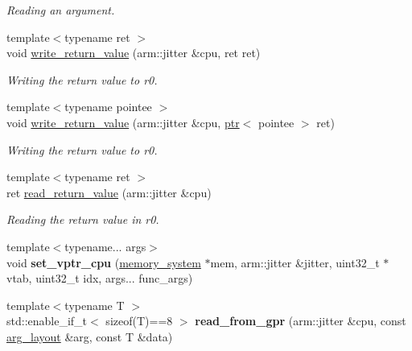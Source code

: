 \begin{DoxyCompactItemize}
\begin{DoxyCompactList}\small\item\em Reading an argument. \end{DoxyCompactList}\item 
{\footnotesize template$<$typename ret $>$ }\\void \mbox{\hyperlink{namespaceeka2l1_1_1hle_ae6e670dc04b65bf275586cd1e5183d2b}{write\+\_\+return\+\_\+value}} (arm\+::jitter \&cpu, ret ret)
\begin{DoxyCompactList}\small\item\em Writing the return value to r0. \end{DoxyCompactList}\item 
{\footnotesize template$<$typename pointee $>$ }\\void \mbox{\hyperlink{namespaceeka2l1_1_1hle_a4459527ec360342d62e8cb01de2634f4}{write\+\_\+return\+\_\+value}} (arm\+::jitter \&cpu, \mbox{\hyperlink{classeka2l1_1_1ptr}{ptr}}$<$ pointee $>$ ret)
\begin{DoxyCompactList}\small\item\em Writing the return value to r0. \end{DoxyCompactList}\item 
{\footnotesize template$<$typename ret $>$ }\\ret \mbox{\hyperlink{namespaceeka2l1_1_1hle_a8ef613fd50bfcf8c9f12277fab20005b}{read\+\_\+return\+\_\+value}} (arm\+::jitter \&cpu)
\begin{DoxyCompactList}\small\item\em Reading the return value in r0. \end{DoxyCompactList}\item 
\mbox{\label{namespaceeka2l1_1_1hle_ac65c3d07be4c03479e5daf5a67f6a43f}} 
{\footnotesize template$<$typename... args$>$ }\\void {\bfseries set\+\_\+vptr\+\_\+cpu} (\mbox{\hyperlink{classeka2l1_1_1memory__system}{memory\+\_\+system}} $\ast$mem, arm\+::jitter \&jitter, uint32\+\_\+t $\ast$vtab, uint32\+\_\+t idx, args... func\+\_\+args)
\item 
\mbox{\label{namespaceeka2l1_1_1hle_a0b325c11bead99365d57fae586d47cf8}} 
{\footnotesize template$<$typename T $>$ }\\std\+::enable\+\_\+if\+\_\+t$<$ sizeof(T)==8 $>$ {\bfseries read\+\_\+from\+\_\+gpr} (arm\+::jitter \&cpu, const \mbox{\hyperlink{structeka2l1_1_1hle_1_1arg__layout}{arg\+\_\+layout}} \&arg, const T \&data)

\end{DoxyCompactItemize}
